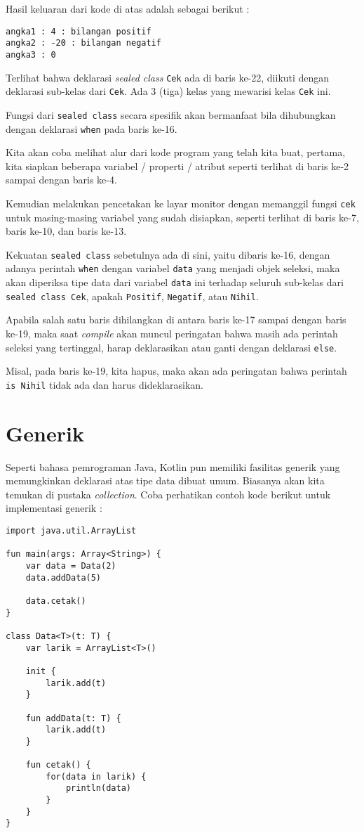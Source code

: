 Hasil keluaran dari kode di atas adalah sebagai berikut :

\begin{lstlisting}
angka1 : 4 : bilangan positif
angka2 : -20 : bilangan negatif
angka3 : 0
\end{lstlisting}

Terlihat bahwa deklarasi \textit{sealed class} \texttt{Cek} ada di baris ke-22, diikuti dengan deklarasi sub-kelas dari \texttt{Cek}. Ada 3 (tiga) kelas yang mewarisi kelas \texttt{Cek} ini.

Fungsi dari \texttt{sealed class} secara spesifik akan bermanfaat bila dihubungkan dengan deklarasi \texttt{when} pada baris ke-16.

Kita akan coba melihat alur dari kode program yang telah kita buat, pertama, kita siapkan beberapa variabel / properti / atribut seperti terlihat di baris ke-2 sampai dengan baris ke-4.

Kemudian melakukan pencetakan ke layar monitor dengan memanggil fungsi \texttt{cek} untuk masing-masing variabel yang sudah disiapkan, seperti terlihat di baris ke-7, baris ke-10, dan baris ke-13.

Kekuatan \texttt{sealed class} sebetulnya ada di sini, yaitu dibaris ke-16, dengan adanya perintah \texttt{when} dengan variabel \texttt{data} yang menjadi objek seleksi, maka akan diperiksa tipe data dari variabel \texttt{data} ini terhadap seluruh sub-kelas dari \texttt{sealed class Cek}, apakah \texttt{Positif}, \texttt{Negatif}, atau \texttt{Nihil}.

Apabila salah satu baris dihilangkan di antara baris ke-17 sampai dengan baris ke-19, maka saat \textit{compile} akan muncul peringatan bahwa masih ada perintah seleksi yang tertinggal, harap deklarasikan atau ganti dengan deklarasi \texttt{else}.

Misal, pada baris ke-19, kita hapus, maka akan ada peringatan bahwa perintah \texttt{is Nihil} tidak ada dan harus dideklarasikan.

\section{Generik} \label{secGenerik}

Seperti bahasa pemrograman Java, Kotlin pun memiliki fasilitas generik yang memungkinkan deklarasi atas tipe data dibuat umum. Biasanya akan kita temukan di pustaka \textit{collection}. Coba perhatikan contoh kode berikut untuk implementasi generik :

\begin{lstlisting}
import java.util.ArrayList

fun main(args: Array<String>) {
	var data = Data(2)
	data.addData(5)
	
	data.cetak()
}

class Data<T>(t: T) {
	var larik = ArrayList<T>()
	
	init {
		larik.add(t)
	}
	
	fun addData(t: T) {
		larik.add(t)
	}
	
	fun cetak() {
		for(data in larik) {
			println(data)
		}
	}
}
\end{lstlisting}

